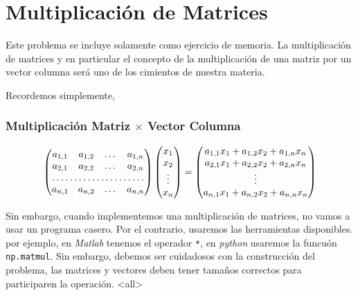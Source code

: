 \section{Multiplicación de Matrices}


Este problema se incluye solamente como 
ejercicio de memoria. La multiplicación de matrices
y en particular el concepto de la multiplicación 
de una matriz por un vector columna será uno de 
los cimientos de nuestra materia. 

Recordemos simplemente, 

\mode*

\begin{frame}[label=FrameEquationMatMul]
  \frametitle<presentation>{Multiplicación Matriz $\times$ Vector Columna}

  \begin{equation}
    \begin{pmatrix}
      a_{1,1} & a_{1,2} & \dots & a_{1,n}  \\
	   a_{2,1} & a_{2,2} & \dots & a_{2,n} \\
	   \hdotsfor{4} \\
	   a_{n,1} & a_{n,2} & \dots & a_{n,n} 
    \end{pmatrix}
    \begin{pmatrix}
      x_{1} \\ x_{2} \\ \vdots \\ x_n 
    \end{pmatrix}
  =
    \begin{pmatrix}
      a_{1,1} x_1 +  a_{1,2} x_2 +  a_{1,n} x_n  \\
      a_{2,1} x_1 +  a_{2,2} x_2 +  a_{2,n} x_n  \\
      \vdots \\
      a_{n,1} x_1 +  a_{n,2} x_2 +  a_{n,n} x_n 
    \end{pmatrix}
  \end{equation}

\end{frame}


Sin embargo, cuando implementemos una multiplicación de matrices, no
vamos a usar un programa casero. Por el contrario, usaremos
las herramientas disponibles. por ejemplo, en \emph{Matlab} tenemos
el operador \texttt{*}, en \emph{python} usaremos la funcuón
\texttt{np.matmul}. Sin embargo, debemos ser cuidadosos 
con la construcción del problema, las matrices y vectores deben
tener tamaños correctos para participaren la operación.
\mode*
\mode<all>
